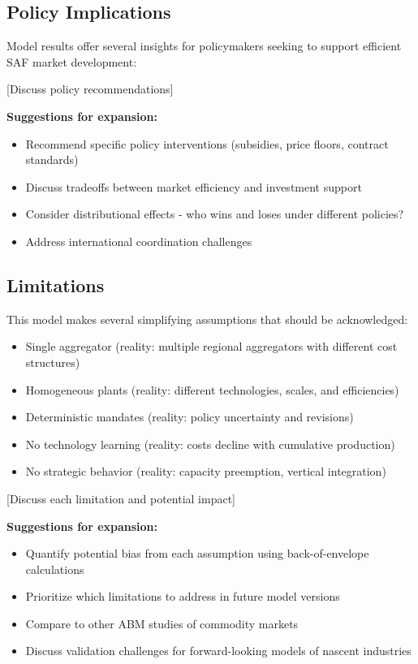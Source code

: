 \documentclass[10.5pt]{article}
\begin{document}
\subsection{Policy Implications}

Model results offer several insights for policymakers seeking to support efficient SAF market development:

[Discuss policy recommendations]

\textbf{Suggestions for expansion:}
\begin{itemize}
    \item Recommend specific policy interventions (subsidies, price floors, contract standards)
    \item Discuss tradeoffs between market efficiency and investment support
    \item Consider distributional effects - who wins and loses under different policies?
    \item Address international coordination challenges
\end{itemize}

\subsection{Limitations}

This model makes several simplifying assumptions that should be acknowledged:

\begin{itemize}
    \item Single aggregator (reality: multiple regional aggregators with different cost structures)
    \item Homogeneous plants (reality: different technologies, scales, and efficiencies)
    \item Deterministic mandates (reality: policy uncertainty and revisions)
    \item No technology learning (reality: costs decline with cumulative production)
    \item No strategic behavior (reality: capacity preemption, vertical integration)
\end{itemize}

[Discuss each limitation and potential impact]

\textbf{Suggestions for expansion:}
\begin{itemize}
    \item Quantify potential bias from each assumption using back-of-envelope calculations
    \item Prioritize which limitations to address in future model versions
    \item Compare to other ABM studies of commodity markets
    \item Discuss validation challenges for forward-looking models of nascent industries
\end{itemize}
\end{document}
